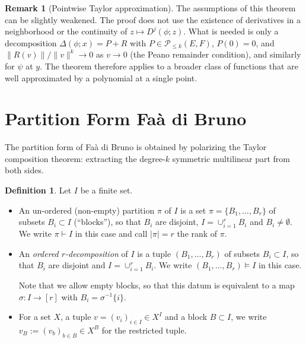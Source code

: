 \documentclass[10pt,a4paper]{article}
\theoremstyle{plain}
\theoremstyle{definition}
\newtheorem{definition}[theorem]{Definition}
\newtheorem{remark}[theorem]{Remark}
\newcommand{\1}{\mathbb{1}} %
\newcommand{\set}[1]{\{#1\}} %
\newcommand{\ra}{\rightarrow} %
\newcommand{\union}{\cup} %
\renewcommand{\part}{\vdash} %
\newcommand{\opart}{\models} %
\begin{document}
\begin{remark}[Pointwise Taylor approximation]

The assumptions of this theorem can be slightly weakened. The proof does
not use the existence of derivatives in a neighborhood or the continuity
of \(z \mapsto D^j(\phi; z)\). What is needed is only a decomposition
\(\Delta(\phi; x) = P + R\) with \(P \in \mathcal{P}_{\le k}(E,F)\),
\(P(0) = 0\), and \(\|R(v)\|/\|v\|^k \to 0\) as \(v \to 0\) (the Peano
remainder condition), and similarly for \(\psi\) at \(y\). The theorem
therefore applies to a broader class of functions that are well
approximated by a polynomial at a single point.

\end{remark}

\section{Partition Form Faà di
Bruno}\label{partition-form-fauxe0-di-bruno}

The partition form of Faà di Bruno is obtained by polarizing the Taylor
composition theorem: extracting the degree-\(k\) symmetric multilinear
part from both sides.

\begin{definition}

Let \(I\) be a finite set.

\begin{itemize}
\item
  An un-ordered (non-empty) partition \(\pi\) of \(I\) is a set
  \(\pi = \set{B_1,\dots,B_r}\) of subsets \(B_i \subset I\)
  (``blocks''), so that \(B_i\) are disjoint, \(I = \union_{i=1}^r B_i\)
  and \(B_i \neq \emptyset\). We write \(\pi \part I\) in this case and
  call \(|\pi| = r\) the rank of \(\pi\).
\item
  An \emph{ordered \(r\)-decomposition} of \(I\) is a tuple
  \((B_1,\dots,B_r)\) of subsets \(B_i \subset I\), so that \(B_i\) are
  disjoint and \(I = \union_{i=1}^r B_i\). We write
  \((B_1,\dots,B_r) \opart I\) in this case.

  Note that we allow empty blocks, so that this datum is equivalent to a
  map \(\sigma: I \ra [r]\) with \(B_i = \sigma^{-1}\set{i}\).
\item
  For a set \(X\), a tuple \(v = (v_i)_{i \in I} \in X^I\) and a block
  \(B \subset I\), we write \(v_B := (v_b)_{b \in B} \in X^B\) for the
  restricted tuple.
\end{itemize}

\end{definition}
\end{document}
